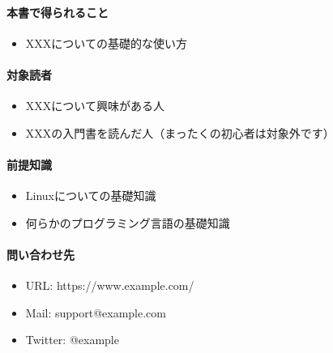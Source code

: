 \paragraph*{本書で得られること}
\label{sec:-0-0-0-1}

\begin{itemize}
\item XXXについての基礎的な使い方
\end{itemize}

\paragraph*{対象読者}
\label{sec:-0-0-0-2}

\begin{itemize}
\item XXXについて興味がある人
\item XXXの入門書を読んだ人（まったくの初心者は対象外です）
\end{itemize}

\paragraph*{前提知識}
\label{sec:-0-0-0-3}

\begin{itemize}
\item Linuxについての基礎知識
\item 何らかのプログラミング言語の基礎知識
\end{itemize}

\paragraph*{問い合わせ先}
\label{sec:-0-0-0-4}

\begin{itemize}
\item URL: https://www.example.com/
\item Mail: support@example.com
\item Twitter: @example
\end{itemize}
